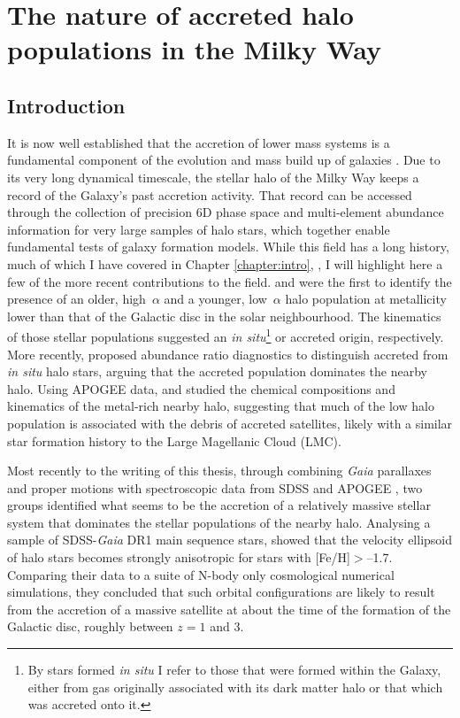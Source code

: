 \chapter{The nature of accreted halo populations in the Milky Way}
\label{chapter:highe}
\section{Introduction} \label{intro}

It is now well established that the accretion of lower mass systems is a fundamental component of the evolution and mass build up of galaxies \citep[e.g.][]{1991ApJ...379...52W}.  Due to its very long dynamical
timescale, the stellar halo of the Milky Way keeps a record of the
Galaxy's past accretion activity.  That record can be accessed
through the collection of precision 6D phase space and multi-element
abundance information for very large samples of halo stars, which
together enable fundamental tests of galaxy formation models.  While
this field has a long history, much of which I have covered in Chapter \ref{chapter:intro}, 
\citep[e.g.,][]{1962ApJ...136..748E,1978ApJ...225..357S}, I will highlight here a few of the more recent contributions to the field.  \citet{2010A&A...511L..10N} and \citet{2012A&A...538A..21S}
were the first to identify the presence of an older, high~$\alpha$
and a younger, low~$\alpha$ halo population at metallicity lower
than that of the Galactic disc in the solar neighbourhood.
The kinematics of those stellar populations suggested an {\it in
situ}\footnote{ By stars formed {\it in situ} I refer to those
that were formed within the Galaxy, either from gas originally
associated with its dark matter halo or that which was accreted
onto it.} or accreted origin, respectively. More
recently, \citet{2015MNRAS.453..758H} proposed abundance ratio
diagnostics to distinguish accreted from {\it in situ} halo stars,
arguing that the accreted population dominates the nearby halo.
Using APOGEE data, \citet{2018ApJ...852...50F} and
\citet{2018ApJ...852...49H} studied the chemical compositions and
kinematics of the metal-rich nearby halo, suggesting that much of
the low \mgfe{} halo population is associated with the debris of
accreted satellites, likely with a similar star formation history
to the Large Magellanic Cloud (LMC).


Most recently to the writing of this thesis, through combining \emph{Gaia} parallaxes and proper motions
\citep{2016arXiv160904303L,2018arXiv180409365G} with spectroscopic
data from SDSS \citep{2000AJ....120.1579Y} and APOGEE
\citep{2015arXiv150905420M}, two groups identified what seems
to be the accretion of a relatively massive stellar system that
dominates the stellar populations of the nearby halo.  Analysing a
sample of SDSS-\emph{Gaia} DR1 main sequence stars,
\citet{2018MNRAS.478..611B} showed that the velocity ellipsoid of
halo stars becomes strongly anisotropic for stars with [Fe/H]$>$--1.7.
Comparing their data to a suite of N-body only cosmological
numerical simulations, they concluded that such orbital configurations
are likely to result from the accretion of a massive satellite at
about the time of the formation of the Galactic disc, roughly between
$z=1$ and 3.

